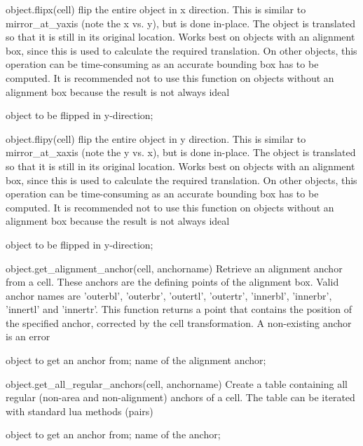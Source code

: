 \begin{APIfunc}{object.flipx(cell)}
    flip the entire object in x direction. This is similar to mirror\_at\_yaxis (note the x vs. y), but is done in-place. The object is translated so that it is still in its original location. Works best on objects with an alignment box, since this is used to calculate the required translation. On other objects, this operation can be time-consuming as an accurate bounding box has to be computed. It is recommended not to use this function on objects without an alignment box because the result is not always ideal
    \begin{APIparameters}
            object to be flipped in y-direction;
    \end{APIparameters}
\end{APIfunc}
\begin{APIfunc}{object.flipy(cell)}
    flip the entire object in y direction. This is similar to mirror\_at\_xaxis (note the y vs. x), but is done in-place. The object is translated so that it is still in its original location. Works best on objects with an alignment box, since this is used to calculate the required translation. On other objects, this operation can be time-consuming as an accurate bounding box has to be computed. It is recommended not to use this function on objects without an alignment box because the result is not always ideal
    \begin{APIparameters}
            object to be flipped in y-direction;
    \end{APIparameters}
\end{APIfunc}
\begin{APIfunc}{object.get\_alignment\_anchor(cell, anchorname)}
    Retrieve an alignment anchor from a cell. These anchors are the defining points of the alignment box. Valid anchor names are 'outerbl', 'outerbr', 'outertl', 'outertr', 'innerbl', 'innerbr', 'innertl' and 'innertr'. This function returns a point that contains the position of the specified anchor, corrected by the cell transformation. A non-existing anchor is an error
    \begin{APIparameters}
            object to get an anchor from;
            name of the alignment anchor;
    \end{APIparameters}
\end{APIfunc}
\begin{APIfunc}{object.get\_all\_regular\_anchors(cell, anchorname)}
    Create a table containing all regular (non-area and non-alignment) anchors of a cell. The table can be iterated with standard lua methods (pairs)
    \begin{APIparameters}
            object to get an anchor from;
            name of the anchor;
    \end{APIparameters}
\end{APIfunc}
